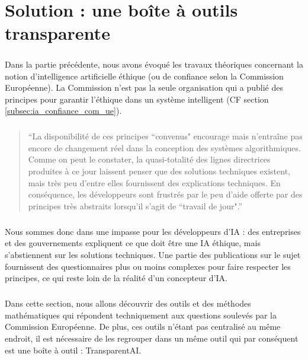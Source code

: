 \documentclass[10pt, french, a4paper]{report}
\begin{document}
\newpage
\chapter{Solution : une boîte à outils transparente}

\paragraph{}
Dans la partie précédente, nous avons évoqué les travaux théoriques concernant la notion d'intelligence artificielle éthique (ou de confiance selon la Commission Européenne). La Commission n'est pas la seule organisation qui a publié des principes pour garantir l'éthique dans un système intelligent (CF section \ref{subsec:ia_confiance_com_ue}).

\paragraph{}
\begin{quotation}
  ``La disponibilité de ces principes ``convenus" encourage mais n'entraîne pas encore de changement réel dans la conception des systèmes algorithmiques. Comme on peut le constater, la quasi-totalité des lignes directrices produites à ce jour laissent penser que des solutions techniques existent, mais très peu d'entre elles fournissent des explications techniques. En conséquence, les développeurs sont frustrés par le peu d'aide offerte par des principes très abstraits lorsqu'il s'agit de ``travail de jour".''
\end{quotation}

\paragraph{}
Nous sommes donc dans une impasse pour les développeurs d'IA : des entreprises et des gouvernements expliquent ce que doit être une IA éthique, mais s'abstiennent sur les solutions techniques. Une partie des publications sur le sujet fournissent des questionnaires plus ou moins complexes pour faire respecter les principes, ce qui reste loin de la réalité d'un concepteur d'IA.

\paragraph{}
Dans cette section, nous allons découvrir des outils et des méthodes mathématiques qui répondent techniquement aux questions soulevés par la Commission Européenne. De plus, ces outils n'étant pas centralisé au même endroit, il est nécessaire de les regrouper dans un même outil qui par conséquent est une boîte à outil : TransparentAI. 
\end{document}
